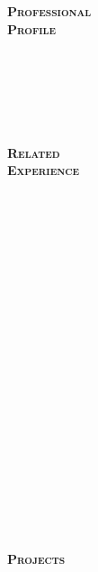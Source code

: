 \documentclass[10pt]{article}
\begin{document}
\begin{minipage}[t]{0.16\linewidth} 
	\textbf{\textsc{
	\hspace{-5pt}Professional\\Profile \\ \\ \\ \\ \\ \\ \\
	Related\\Experience \\ \\ \\ \\ \\ \\ \\ \\ \\ \\ \\ \\ \\ \\ \\ \\ \\ \\ \\ \\ \\ \\
	Projects
	}}
\end{minipage}
\end{document}
